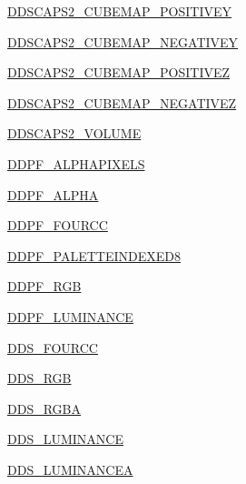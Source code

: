 \begin{DoxyCompactItemize}
\hyperlink{namespacePIL_1_1DdsImagePlugin_a993ab8bd872f0f0c9c9de5311ed6b067}{D\+D\+S\+C\+A\+P\+S2\+\_\+\+C\+U\+B\+E\+M\+A\+P\+\_\+\+P\+O\+S\+I\+T\+I\+V\+EY}
\item 
\hyperlink{namespacePIL_1_1DdsImagePlugin_a06b36883b54446b1a95225d3c85abc5a}{D\+D\+S\+C\+A\+P\+S2\+\_\+\+C\+U\+B\+E\+M\+A\+P\+\_\+\+N\+E\+G\+A\+T\+I\+V\+EY}
\item 
\hyperlink{namespacePIL_1_1DdsImagePlugin_adbdbbb3f90b986a9be0b8fc2139e3827}{D\+D\+S\+C\+A\+P\+S2\+\_\+\+C\+U\+B\+E\+M\+A\+P\+\_\+\+P\+O\+S\+I\+T\+I\+V\+EZ}
\item 
\hyperlink{namespacePIL_1_1DdsImagePlugin_ad908f35af17f35bb8c9075ab1602fd70}{D\+D\+S\+C\+A\+P\+S2\+\_\+\+C\+U\+B\+E\+M\+A\+P\+\_\+\+N\+E\+G\+A\+T\+I\+V\+EZ}
\item 
\hyperlink{namespacePIL_1_1DdsImagePlugin_a42ea1a22823f39c94374350c99462001}{D\+D\+S\+C\+A\+P\+S2\+\_\+\+V\+O\+L\+U\+ME}
\item 
\hyperlink{namespacePIL_1_1DdsImagePlugin_ab0a24eb994422b559f06f4d2c7e0b524}{D\+D\+P\+F\+\_\+\+A\+L\+P\+H\+A\+P\+I\+X\+E\+LS}
\item 
\hyperlink{namespacePIL_1_1DdsImagePlugin_ab5bf78879dfa037321ba8b99e497ad9e}{D\+D\+P\+F\+\_\+\+A\+L\+P\+HA}
\item 
\hyperlink{namespacePIL_1_1DdsImagePlugin_a206b5dc40026923b6aacd9218892a6df}{D\+D\+P\+F\+\_\+\+F\+O\+U\+R\+CC}
\item 
\hyperlink{namespacePIL_1_1DdsImagePlugin_a610e7bc550e12a69bf8841a38ab831f4}{D\+D\+P\+F\+\_\+\+P\+A\+L\+E\+T\+T\+E\+I\+N\+D\+E\+X\+E\+D8}
\item 
\hyperlink{namespacePIL_1_1DdsImagePlugin_a46c76ddf7b754b244fef69a804966198}{D\+D\+P\+F\+\_\+\+R\+GB}
\item 
\hyperlink{namespacePIL_1_1DdsImagePlugin_a8c9cd21f83d5a97bad3d124bef9eca44}{D\+D\+P\+F\+\_\+\+L\+U\+M\+I\+N\+A\+N\+CE}
\item 
\hyperlink{namespacePIL_1_1DdsImagePlugin_a16323e4e57e925cf2f26e6806f932719}{D\+D\+S\+\_\+\+F\+O\+U\+R\+CC}
\item 
\hyperlink{namespacePIL_1_1DdsImagePlugin_a9e6f97a53abb7de46249e4c707d880d6}{D\+D\+S\+\_\+\+R\+GB}
\item 
\hyperlink{namespacePIL_1_1DdsImagePlugin_a728282130332bd44faa53107855f28b2}{D\+D\+S\+\_\+\+R\+G\+BA}
\item 
\hyperlink{namespacePIL_1_1DdsImagePlugin_a283c09f863c736f954e1732a3201b40f}{D\+D\+S\+\_\+\+L\+U\+M\+I\+N\+A\+N\+CE}
\item 
\hyperlink{namespacePIL_1_1DdsImagePlugin_acec7479d5558e1d2af6da2006804839c}{D\+D\+S\+\_\+\+L\+U\+M\+I\+N\+A\+N\+C\+EA}

\end{DoxyCompactItemize}
